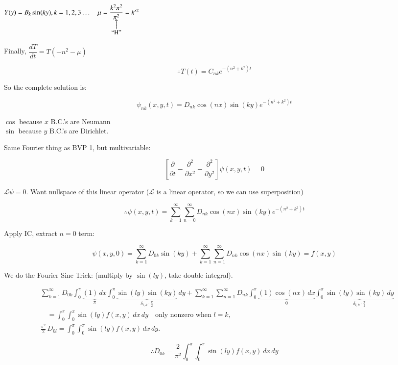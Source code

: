 \documentclass{report}
\makeatletter
\newcommand\parrow[3][3ex]{%
 \begin{array}[t]{@{}c@{}} #2 \\
  \left\uparrow\vcenter{\hrule height #1}\right.\kern-\nulldelimiterspace\\
  \makebox[0pt]{\small#3}
  \end{array}%
}
\makeatother
\begin{document}
$Y(y)=B_{k} \sin (k y), k=1,2,3 \ldots \quad \mu=\parrow{\dfrac{k^{2} \pi^{2}}{\pi^{2}}}{``H''}=k^{\prime 2}$

Finally, $\dfrac{d T}{d t}=T\left(-n^{2}-\mu\right)$

$$
\therefore T(t)=C_{n k} e^{-\left(n^{2}+k^{2}\right) t}
$$

So the complete solution is:

$$
\boxed{\psi_{n k}(x, y, t)=D_{n k} \cos (n x) \sin (k y) e^{-\left(n^{2}+k^{2}\right) t}}
$$

$\cos$ because $x$ B.C.'s are Neumann\\
$\sin$ because $y$ B.C.'s are Dirichlet.

Same Fourier thing as BVP 1, but multivariable:

$$
\left[\dfrac{\partial}{\partial t}-\dfrac{\partial^{2}}{\partial x^{2}}-\dfrac{\partial^{2}}{\partial y^{2}}\right] \psi(x, y, t)=0
$$

$\mathcal{L} \psi=0$. Want nullspace of this linear operator ($\mathcal{L}$ is a linear operator, so we can use superposition)

$$
\therefore \psi(x, y, t)=\sum\limits_{k=1}^{\infty} \sum\limits_{n=0}^{\infty} D_{n k} \cos (n x) \sin (k y) e^{-\left(n^{2}+k^{2}\right) t}
$$

Apply IC, extract $n=0$ term:

$$
\psi(x, y, 0)=\sum\limits_{k=1}^{\infty} D_{0 k} \sin (k y)+\sum\limits_{k=1}^{\infty} \sum\limits_{n=1}^{\infty} D_{n k} \cos (n x) \sin (k y)=f(x, y)
$$

We do the Fourier Sine Trick: (multiply by $\sin(ly)$, take double integral).

$$
\begin{aligned}
& \sum_{k=1}^{\infty} D_{0k} \int_{0}^{\pi} \underbrace{(1)\,dx}_{\pi} \int_{0}^{\pi} \underbrace{\sin(l y)\sin(ky)}_{\delta_{l,k}\cdot \frac{\pi}{2}}\,dy 
+ \sum_{k=1}^{\infty} \sum_{n=1}^{\infty} D_{nk} \int_{0}^{\pi} \underbrace{(1)\cos(nx)\,dx}_{0} \int_{0}^{\pi} \underbrace{\sin(l y)\sin(ky)\,dy}_{\delta_{l,k}\cdot \frac{\pi}{2}}\\[1ex]
&\quad = \int_{0}^{\pi} \int_{0}^{\pi} \sin(l y)f(x,y)\,dx\,dy\quad\text{only nonzero when } l=k,\\[1ex]
& \frac{\pi^2}{2}\, D_{0l} = \int_{0}^{\pi} \int_{0}^{\pi} \sin(l y)f(x,y)\,dx\,dy.
\end{aligned}
$$

$$
\therefore \boxed{D_{0k}=\frac{2}{\pi^{2}} \int_{0}^{\pi} \int_{0}^{\pi} \sin(l y)f(x,y)\,dx\,dy}
$$
\end{document}
